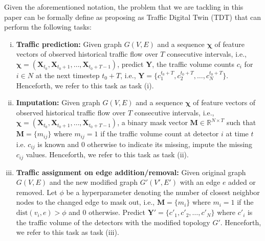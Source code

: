 Given the aforementioned notation, the problem that we are tackling in this paper can be formally define as proposing as Traffic Digital Twin (TDT) that can perform the following tasks:
\begin{enumerate}[(i)]
    \item \textbf{Traffic prediction:} Given graph $G(V, E)$ and a sequence $\bm{\chi}$ of feature vectors of observed historical traffic flow over $T$ consecutive intervals, i.e., $\bm{\chi} = (\mathbf{X}_{t_0}, \mathbf{X}_{t_0+1}, \ldots, \mathbf{X}_{t_0+T-1})$, predict $\mathbf{Y}$, the traffic volume counts $c_i$ for $i \in N$ at the next timestep $t_0+T$, i.e., $\mathbf{Y} = \{c_1^{t_0+T}, c_2^{t_0+T}, \ldots, c_N^{t_0+T}\}$. Henceforth, we refer to this task as task (i).
    \item \textbf{Imputation:} Given graph $G(V,E)$ and a sequence $\bm{\chi}$ of feature vectors of observed historical traffic flow over $T$ consecutive intervals, i.e., $\bm{\chi} = (\mathbf{X}_{t_0}, \mathbf{X}_{t_0+1}, \ldots, \mathbf{X}_{t_0+T-1})$, a binary mask vector $\mathbf{M} \in \mathbb{R}^{N \times T}$ such that $\mathbf{M} = \{m_{ij}\}$ where $m_{ij} = 1$ if the traffic volume count at detector $i$ at time $t$ i.e. $c_{ij}$ is known and 0 otherwise to indicate its missing, impute the missing $c_{ij}$ values. Henceforth, we refer to this task as task (ii).
    \item \textbf{Traffic assignment on edge addition/removal:} Given original graph $G(V,E)$ and the new modified graph $G'(V', E')$ with an edge $e$ added or removed. Let $\phi$ be a hyperparameter denoting the number of closest neighbor nodes to the changed edge to mask out, i.e., $\mathbf{M} = \{m_i\}$ where $m_i = 1$ if the $\text{dist}(v_i,e)> \phi$ and 0 otherwise. Predict $\mathbf{Y'} = \{c'_1, c'_2, \ldots, c'_N \}$ where $c'_i$ is the traffic volume of the detectors with the modified topology $G'$. Henceforth, we refer to this task as task (iii).
\end{enumerate}
